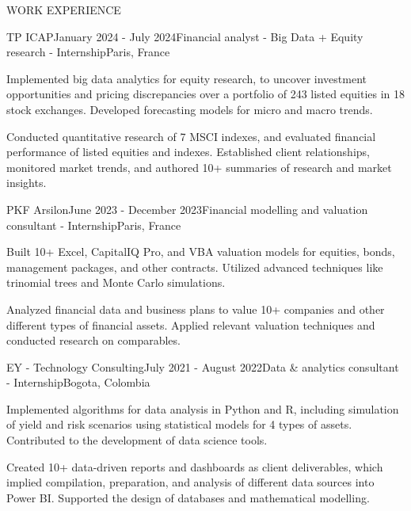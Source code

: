 \documentclass{resume} %
\begin{document}
\begin{rSection}{WORK EXPERIENCE}

    \vspace{0.3em}
    \begin{rSubsection}{TP ICAP}{January 2024 - July 2024}{Financial analyst - Big Data + Equity research - Internship}{Paris, France}
        \item Implemented big data analytics for equity research, to uncover investment opportunities and pricing discrepancies over a portfolio of 243 listed equities in 18 stock exchanges. Developed forecasting models for micro and macro trends.
        \item Conducted quantitative research of 7 MSCI indexes, and evaluated financial performance of listed equities and indexes. Established client relationships, monitored market trends, and authored 10+ summaries of research and market insights.
    \end{rSubsection}
    
    \begin{rSubsection}{PKF Arsilon}{June 2023 - December 2023}{Financial modelling and valuation consultant - Internship}{Paris, France}
        \item Built 10+ Excel, CapitalIQ Pro, and VBA valuation models for equities, bonds, management packages, and other contracts. Utilized advanced techniques like trinomial trees and Monte Carlo simulations.
        \item Analyzed financial data and business plans to value 10+ companies and other different types of financial assets. Applied relevant valuation techniques and conducted research on comparables. %
    \end{rSubsection}
    
    \begin{rSubsection}{EY - Technology Consulting}{July 2021 - August 2022}{Data \& analytics consultant - Internship}{Bogota, Colombia}
        \item Implemented algorithms for data analysis in Python and R, including simulation of yield and risk scenarios using statistical models for 4 types of assets. Contributed to the development of data science tools.
        \item Created 10+ data-driven reports and dashboards as client deliverables, which implied compilation, preparation, and analysis of different data sources into Power BI. Supported the design of databases and mathematical modelling.
    \end{rSubsection}
    \end{rSection}
    
\end{document}
